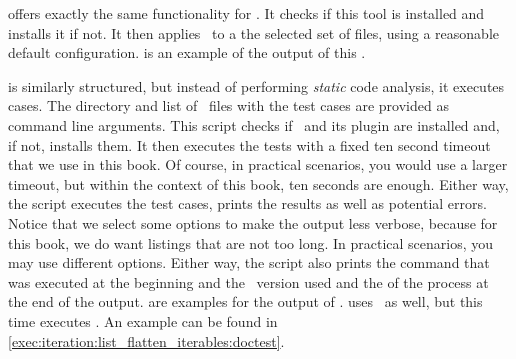  offers exactly the same functionality for \pylint.
It checks if this tool is installed and installs it if not.
It then applies \pylint\ to a the selected set of files, using a reasonable default configuration.
 is an example of the output of this .

 is similarly structured, but instead of performing \emph{static} code analysis, it executes  cases.
The directory and list of \python\ files with the test cases are provided as command line arguments.
This script checks if \pytest\ and its plugin  are installed and, if not, installs them.
It then executes the tests with a fixed ten second timeout that we use in this book.
Of course, in practical scenarios, you would use a larger timeout, but within the context of this book, ten seconds are enough.
Either way, the script executes the test cases, prints the results as well as potential errors.
Notice that we select some options to make the output less verbose, because for this book, we do want listings that are not too long.
In practical scenarios, you may use different options.
Either way, the script also prints the command that was executed at the beginning and the \pytest\ version used and the  of the process at the end of the output.
 are examples for the output of \pytest.
 uses \pytest\ as well, but this time executes .
An example can be found in \cref{exec:iteration:list_flatten_iterables:doctest}.%
%
\endhsection%
%
